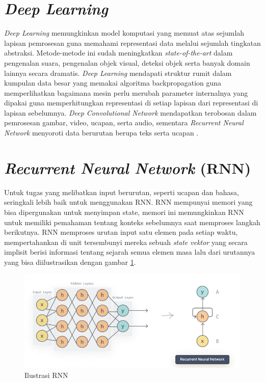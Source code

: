 \section{\emph{Deep Learning}}
\emph{Deep Learning} memungkinkan model komputasi yang memuat atas sejumlah lapisan pemrosesan guna memahami representasi data
melalui sejumlah tingkatan abstraksi. Metode-metode ini sudah meningkatkan \emph{state-of-the-art} dalam pengenalan suara,
pengenalan objek visual, deteksi objek serta banyak domain lainnya secara dramatis. \emph{Deep Learning} mendapati struktur
rumit dalam kumpulan data besar yang memakai algoritma backpropagation guna memperlihatkan bagaimana mesin perlu merubah
parameter internalnya yang dipakai guna memperhitungkan representasi di setiap lapisan dari representasi di lapisan
sebelumnya. \emph{Deep Convolutional Network} mendapatkan terobosan dalam pemrosesan gambar, video, ucapan, serta audio,
sementara \emph{Recurrent Neural Network} menyoroti data berurutan berupa teks serta ucapan \parencite{18}.

\section{\emph{Recurrent Neural Network} (RNN)}

Untuk tugas yang melibatkan input berurutan, seperti ucapan dan bahasa, seringkali lebih baik untuk menggunakan RNN.
RNN mempunyai memori yang bisa dipergunakan untuk menyimpan state, memori ini memungkinkan RNN untuk memiliki pemahaman
tentang konteks sebelumnya saat memproses langkah berikutnya. RNN memproses urutan input satu elemen pada setiap waktu,
mempertahankan di unit tersembunyi mereka sebuah \emph{state vektor} yang secara implisit berisi informasi tentang sejarah semua
elemen masa lalu dari urutannya yang bisa diilustrasikan dengan gambar \ref{fig:rnn}.

\newpage
\begin{figure} [ht] \centering
  \includegraphics[scale=0.55]{gambar/rnn.png}
  \caption{Ilustrasi RNN \parencite{18}}
  \label{fig:rnn}
\end{figure}


